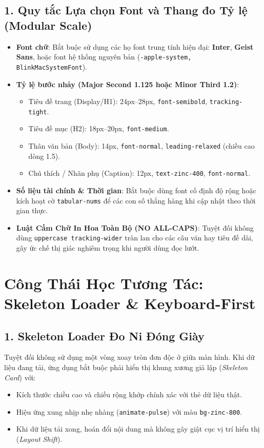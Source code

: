 \documentclass[a4paper,11pt]{article}
\begin{document}
\subsection{1. Quy tắc Lựa chọn Font và Thang đo Tỷ lệ (Modular Scale)}
\begin{itemize}[leftmargin=1.5em]
    \item \textbf{Font chữ}: Bắt buộc sử dụng các họ font trung tính hiện đại: \textbf{Inter}, \textbf{Geist Sans}, hoặc font hệ thống nguyên bản (\texttt{-apple-system, BlinkMacSystemFont}).
    \item \textbf{Tỷ lệ bước nhảy (Major Second 1.125 hoặc Minor Third 1.2)}:
    \begin{itemize}
        \item Tiêu đề trang (Display/H1): 24px--28px, \texttt{font-semibold}, \texttt{tracking-tight}.
        \item Tiêu đề mục (H2): 18px--20px, \texttt{font-medium}.
        \item Thân văn bản (Body): 14px, \texttt{font-normal}, \texttt{leading-relaxed} (chiều cao dòng 1.5).
        \item Chú thích / Nhãn phụ (Caption): 12px, \texttt{text-zinc-400}, \texttt{font-normal}.
    \end{itemize}
    \item \textbf{Số liệu tài chính \& Thời gian}: Bắt buộc dùng font cố định độ rộng hoặc kích hoạt cờ \texttt{tabular-nums} để các con số thẳng hàng khi cập nhật theo thời gian thực.
    \item \textbf{Luật Cấm Chữ In Hoa Toàn Bộ (NO ALL-CAPS)}: Tuyệt đối không dùng \texttt{uppercase tracking-wider} tràn lan cho các câu văn hay tiêu đề dài, gây ức chế thị giác nghiêm trọng khi người dùng đọc lướt.
\end{itemize}

\section{Công Thái Học Tương Tác: Skeleton Loader \& Keyboard-First}

\subsection{1. Skeleton Loader Đo Ni Đóng Giày}
Tuyệt đối không sử dụng một vòng xoay tròn đơn độc ở giữa màn hình. Khi dữ liệu đang tải, ứng dụng bắt buộc phải hiển thị khung xương giả lập (\textit{Skeleton Card}) với:
\begin{itemize}[leftmargin=1.5em]
    \item Kích thước chiều cao và chiều rộng khớp chính xác với thẻ dữ liệu thật.
    \item Hiệu ứng xung nhịp nhẹ nhàng (\texttt{animate-pulse}) với màu \texttt{bg-zinc-800}.
    \item Khi dữ liệu tải xong, hoán đổi nội dung mà không gây giật cục vị trí hiển thị (\textit{Layout Shift}).
\end{itemize}
\end{document}
